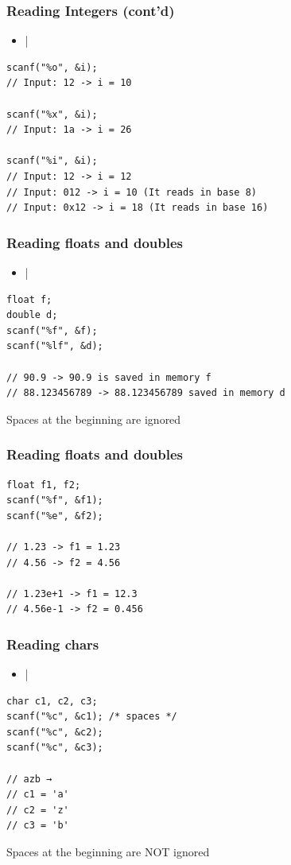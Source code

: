 \documentclass{../c-lecture}
\begin{document}
\begin{frame}[fragile]
  \frametitle{Reading Integers (cont’d)}
  \begin{itemize}
    \item {}|%
  \end{itemize}
  \begin{verbatim}
scanf("%o", &i);
// Input: 12 -> i = 10

scanf("%x", &i);
// Input: 1a -> i = 26

scanf("%i", &i);
// Input: 12 -> i = 12
// Input: 012 -> i = 10 (It reads in base 8)
// Input: 0x12 -> i = 18 (It reads in base 16)
  \end{verbatim}
\end{frame}

\begin{frame}[fragile]
  \frametitle{Reading floats and doubles}
  \begin{itemize}
    \item {}|%
  \end{itemize}
  \begin{verbatim}
float f;
double d;
scanf("%f", &f);
scanf("%lf", &d);

// 90.9 -> 90.9 is saved in memory f
// 88.123456789 -> 88.123456789 saved in memory d
  \end{verbatim}
  \begin{block}{}
  Spaces at the beginning are ignored
  \end{block}
\end{frame}

\begin{frame}[fragile]
  \frametitle{Reading floats and doubles}
  \begin{verbatim}
float f1, f2;
scanf("%f", &f1);
scanf("%e", &f2);

// 1.23 -> f1 = 1.23
// 4.56 -> f2 = 4.56

// 1.23e+1 -> f1 = 12.3
// 4.56e-1 -> f2 = 0.456
  \end{verbatim}
\end{frame}

\begin{frame}[fragile]
  \frametitle{Reading chars}
  \begin{itemize}
    \item {}|%
  \end{itemize}
  \begin{verbatim}
char c1, c2, c3;
scanf("%c", &c1); /* spaces */
scanf("%c", &c2);
scanf("%c", &c3);

// azb →
// c1 = 'a'
// c2 = 'z'
// c3 = 'b'
  \end{verbatim}
  \begin{block}{}
  Spaces at the beginning are NOT ignored
  \end{block}
\end{frame}
\end{document}

